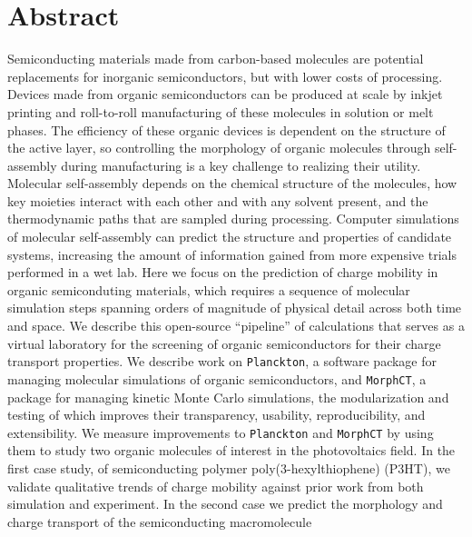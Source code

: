 
\chapter*{Abstract}

Semiconducting materials made from carbon-based molecules are potential replacements for inorganic semiconductors, but with lower costs of processing.
Devices made from organic semiconductors can be produced at scale by inkjet printing and roll-to-roll manufacturing of these molecules in solution or melt phases.  
The efficiency of these organic devices is dependent on the structure of the active layer, so controlling the morphology of organic molecules through self-assembly during manufacturing is a key challenge to realizing their utility.
Molecular self-assembly depends on the chemical structure of the molecules, how key moieties interact with each other and with any solvent present, and the thermodynamic paths that are sampled during processing.
Computer simulations of molecular self-assembly can predict the structure and properties of candidate systems, increasing the amount of information gained from more expensive trials performed in a wet lab.
Here we focus on the prediction of charge mobility in organic semiconduting materials,
which requires a sequence of molecular simulation steps spanning orders of magnitude of physical detail across both time and space.
We describe this open-source ``pipeline'' of calculations that serves as a virtual laboratory for the screening of organic semiconductors for their charge transport properties.
We describe work on \texttt{Planckton}, a software package for managing molecular simulations of organic semiconductors, and \texttt{MorphCT},
a package for managing kinetic Monte Carlo simulations, the modularization and testing of which improves their transparency, usability, reproducibility, and extensibility.
We measure improvements to \texttt{Planckton} and \texttt{MorphCT} by using them to study two organic molecules of interest in the photovoltaics field.
In the first case study, of semiconducting polymer poly(3-hexylthiophene) (P3HT), 
we validate qualitative trends of charge mobility against prior work from both simulation and experiment.
In the second case we predict the morphology and charge transport of the semiconducting macromolecule 
